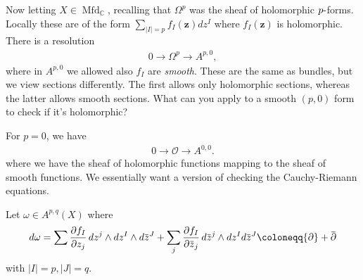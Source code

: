 \begin{remark}

Now letting \(X \in {\operatorname{Mfd}}_{\mathbb{C}}\), recalling that
\(\Omega^p\) was the sheaf of holomorphic \(p {\hbox{-}}\)forms. Locally
these are of the form
\(\sum_{{\left\lvert {I} \right\rvert} = p} f_I(\mathbf{z}) dz^I\) where
\(f_I(\mathbf{z})\) is holomorphic. There is a resolution
\begin{align*}
0 \xrightarrow{} \Omega^p \xrightarrow{} A^{p, 0}
,\end{align*}
where in \(A^{p, 0}\) we allowed also \(f_I\) are \emph{smooth}. These
are the same as bundles, but we view sections differently. The first
allows only holomorphic sections, whereas the latter allows smooth
sections. What can you apply to a smooth \((p, 0)\) form to check if
it's holomorphic?

\end{remark}

\begin{example}[?]

For \(p=0\), we have
\begin{align*}
0 \to {\mathcal{O}}\to A^{0, 0}
.\end{align*}
where we have the sheaf of holomorphic functions mapping to the sheaf of
smooth functions. We essentially want a version of checking the
Cauchy-Riemann equations.

\end{example}

\begin{definition}[?]

Let \(\omega\in A^{p, q}(X)\) where
\begin{align*}
d \omega = \sum {\frac{\partial f_I}{\partial z_j}\,} dz^j \wedge dz^I \wedge d\mkern 1.5mu\overline{\mkern-1.5muz\mkern-1.5mu}\mkern 1.5mu^J + \sum_j {\frac{\partial f_I}{\partial \mkern 1.5mu\overline{\mkern-1.5muz\mkern-1.5mu}\mkern 1.5mu_j}\,} d\mkern 1.5mu\overline{\mkern-1.5muz\mkern-1.5mu}\mkern 1.5mu^j \wedge dz^I d\mkern 1.5mu\overline{\mkern-1.5muz\mkern-1.5mu}\mkern 1.5mu^J\coloneqq{\partial}+ \mkern 1.5mu\overline{\mkern-1.5mu{\partial}\mkern-1.5mu}\mkern 1.5mu 
\end{align*}
with
\({\left\lvert {I} \right\rvert} = p, {\left\lvert {J} \right\rvert} = q\).

\end{definition}

